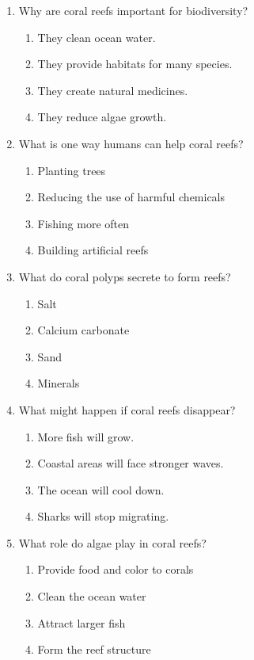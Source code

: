 \documentclass[12pt]{article}
\begin{document}
\begin{enumerate}
\item Why are coral reefs important for biodiversity?
\begin{enumerate}[label=\Alph*.]
    \item They clean ocean water.
    \item They provide habitats for many species.
    \item They create natural medicines.
    \item They reduce algae growth.
\end{enumerate}

\item What is one way humans can help coral reefs?
\begin{enumerate}[label=\Alph*.]
    \item Planting trees
    \item Reducing the use of harmful chemicals
    \item Fishing more often
    \item Building artificial reefs
\end{enumerate}

\item What do coral polyps secrete to form reefs?
\begin{enumerate}[label=\Alph*.]
    \item Salt
    \item Calcium carbonate
    \item Sand
    \item Minerals
\end{enumerate}

\item What might happen if coral reefs disappear?
\begin{enumerate}[label=\Alph*.]
    \item More fish will grow.
    \item Coastal areas will face stronger waves.
    \item The ocean will cool down.
    \item Sharks will stop migrating.
\end{enumerate}

\item What role do algae play in coral reefs?
\begin{enumerate}[label=\Alph*.]
    \item Provide food and color to corals
    \item Clean the ocean water
    \item Attract larger fish
    \item Form the reef structure
\end{enumerate}


\end{enumerate}
\end{document}
